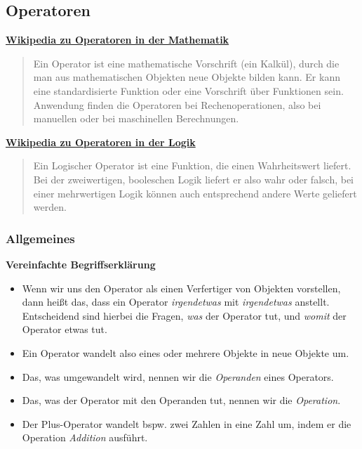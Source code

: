 
\subsection{Operatoren}


\par\noindent\textbf{\href{http://de.wikipedia.org/wiki/Operator_(Mathematik)}{Wikipedia
zu Operatoren in der Mathematik}}

\begin{quote}
Ein Operator ist eine mathematische Vorschrift (ein Kalkül), durch die
man aus mathematischen Objekten neue Objekte bilden kann. Er kann eine
standardisierte Funktion oder eine Vorschrift über Funktionen sein.
Anwendung finden die Operatoren bei Rechenoperationen, also bei
manuellen oder bei maschinellen Berechnungen.
\end{quote}



\par\noindent\textbf{\href{http://de.wikipedia.org/wiki/Operator_(Logik)}{Wikipedia
zu Operatoren in der Logik}}

\begin{quote}
Ein Logischer Operator ist eine Funktion, die einen Wahrheitswert
liefert. Bei der zweiwertigen, booleschen Logik liefert er also wahr
oder falsch, bei einer mehrwertigen Logik können auch entsprechend
andere Werte geliefert werden.
\end{quote}


\subsubsection{Allgemeines}

\par\noindent\textbf{Vereinfachte Begriffserklärung}

\begin{itemize}
\itemsep1pt\parskip0pt
\item
  {Wenn wir uns den Operator als einen Verfertiger von Objekten
  vorstellen, dann heißt das, dass ein Operator \emph{irgendetwas} mit
  \emph{irgendetwas} anstellt. Entscheidend sind hierbei die Fragen,
  \emph{was} der Operator tut, und \emph{womit} der Operator etwas tut.}
\item
  {Ein Operator wandelt also eines oder mehrere Objekte in neue Objekte
  um.}
\item
  {Das, was umgewandelt wird, nennen wir die \emph{Operanden} eines
  Operators.}
\item
  {Das, was der Operator mit den Operanden tut, nennen wir die
  \emph{Operation}.}
\item
  {Der Plus-Operator wandelt bspw. zwei Zahlen in eine Zahl um, indem er
  die Operation \emph{Addition} ausführt.}
\end{itemize}



